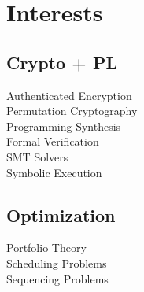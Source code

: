 \documentclass[letterpaper]{clinton-resume}
\begin{document}
\begin{minipage}[t]{0.33\textwidth}
\section{Interests}
\subsection{Crypto + PL}
Authenticated Encryption\\
Permutation Cryptography\\
Programming Synthesis\\
Formal Verification\\
SMT Solvers\\
Symbolic Execution\\
\subsection{Optimization}
Portfolio Theory\\
Scheduling Problems\\
Sequencing Problems\\
\end{minipage}
\end{document}
